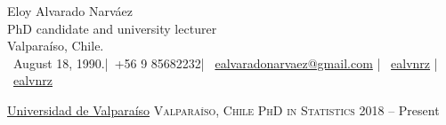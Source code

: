 \documentclass[10pt,a4paper]{article}
\begin{document}
 

\newcommand{\name}{Eloy Alvarado Narváez}
\newcommand{\dob}{August 18, 1990.}
\newcommand{\address}{Valparaíso, Chile.}
\newcommand{\phone}{+56 9 85682232}
\newcommand{\email}{ealvaradonarvaez@gmail.com}
\newcommand{\github}{ealvnrz}
\newcommand{\linkedin}{ealvnrz}

\begin{center}
\huge\name \\

\normalsize PhD candidate and university lecturer \\
\address\\
\faCalendar*[regular]\ \dob \hspace{5pt}|\hspace{5pt}\ \phone \hspace{5pt}|\hspace{5pt} \ \href{mailto:\email}{\email}
\hspace{5pt}|\hspace{5pt}  \ \href{https://github.com/ealvnrz}{\github}
\hspace{5pt}|\hspace{5pt}  \ \href{https://www.linkedin.com/in/ealvnrz/}{\linkedin}
\end{center}








\headedsection 
{\href{https://ideuv.uv.cl/index.php/es/?view=page&id=91}{Universidad de Valparaíso}}
{\textsc{Valparaíso, Chile}}
 {
\headedsubsection 
{\textsc{PhD in Statistics}}
{2018 -- Present}
{}
}
\end{document}
